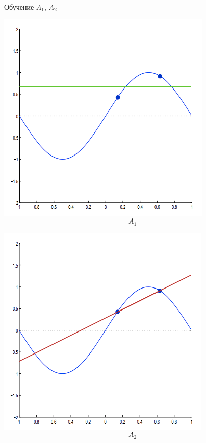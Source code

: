 \documentclass[10pt]{beamer}
\begin{document}
\begin{frame}{Обучение $A_1$, $A_2$}
  \centering
  \begin{minipage}[b]{.45\textwidth}
    \includegraphics[width=\textwidth, keepaspectratio]{images/sin2} 
    $$A_1$$
  \end{minipage}\qquad
  \pause
  \begin{minipage}[b]{.45\textwidth}
    \includegraphics[width=\textwidth, keepaspectratio]{images/sin21}
    $$A_2$$
  \end{minipage}
\end{frame}
\end{document}
